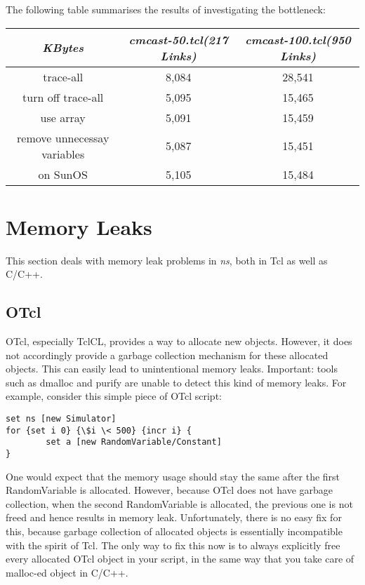 The following table summarises the results of investigating the
bottleneck:\\
\begin{table}[h]
\begin{center}
\begin{tabular}{|c|c|c|}\hline  
{\em KBytes} &{\em cmcast-50.tcl(217 Links)} &{\em cmcast-100.tcl(950 
Links)}\\\hline 
trace-all &8,084 &28,541\\\hline
turn off trace-all &5,095 &15,465 \\\hline
use array &5,091 &15,459\\\hline 
remove unnecessay variables &5,087 &15,451 \\\hline
on SunOS &5,105 &15,484\\\hline
\end{tabular}
\end{center}
\end{table}


\section{Memory Leaks}
\label{memleak}

This section deals with memory leak problems in \emph{ns}, both in Tcl as well
as C/C++.


\subsection{OTcl}
\label{leakTcl}
OTcl, especially TclCL, provides a way to allocate new objects. However,
it does not accordingly provide a garbage collection mechanism for these
allocated objects. This can easily lead to unintentional memory leaks.
Important: tools such as dmalloc and purify are unable to detect this kind
of memory leaks. For example, consider this simple piece of OTcl script: 
\begin{verbatim}
set ns [new Simulator]
for {set i 0} {\$i \< 500} {incr i} {
        set a [new RandomVariable/Constant]
}
\end{verbatim}
One would expect that the memory usage should stay the same after the
first RandomVariable is allocated. However, because OTcl does not have
garbage collection, when the second RandomVariable is allocated, the
previous one is not freed and hence results in memory leak. Unfortunately,
there is no easy fix for this, because garbage collection of allocated
objects is essentially incompatible with the spirit of Tcl. The only way
to fix this now is to always explicitly free every allocated OTcl object
in your script, in the same way that you take care of malloc-ed object in
C/C++. 


